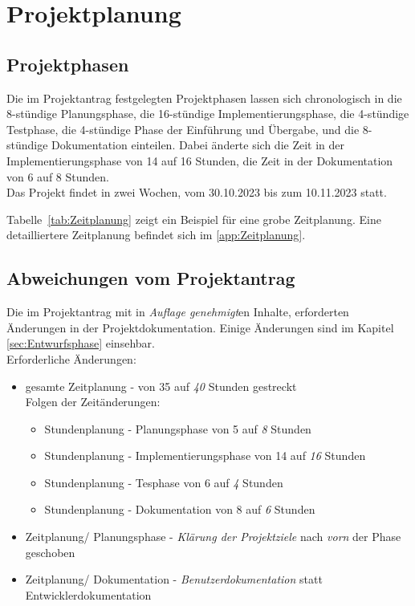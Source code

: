 \section{Projektplanung} 
\label{sec:Projektplanung}


\subsection{Projektphasen}
\label{sec:Projektphasen}
Die im Projektantrag festgelegten Projektphasen lassen sich chronologisch in die 8-stündige Planungsphase, 
die 16-stündige Implementierungsphase, die 4-stündige Testphase, die 4-stündige Phase der Einführung und Übergabe, 
und die 8-stündige Dokumentation einteilen.
Dabei änderte sich die Zeit in der Implementierungsphase von 14 auf 16 Stunden, die Zeit in der 
Dokumentation von 6 auf 8 Stunden.
\\Das Projekt findet in zwei Wochen, vom 30.10.2023 bis zum 10.11.2023 statt.

Tabelle~\ref{tab:Zeitplanung}  zeigt ein Beispiel für eine grobe Zeitplanung. 
Eine detailliertere Zeitplanung befindet sich im  \ref{app:Zeitplanung}.


\subsection{Abweichungen vom Projektantrag}
\label{sec:AbweichungenProjektantrag}
Die im Projektantrag mit in \textit{Auflage genehmigt}en Inhalte, erforderten Änderungen in der 
Projektdokumentation. Einige Änderungen sind im Kapitel \ref*{sec:Entwurfsphase} 
 einsehbar. 
\\Erforderliche Änderungen:
\begin{itemize} [label=--]
	\item gesamte Zeitplanung - von 35 auf \textit{40} Stunden gestreckt
	\\Folgen der Zeitänderungen:
	\begin{itemize}
		\item Stundenplanung - Planungsphase von 5 auf \textit{8} Stunden
		\item Stundenplanung - Implementierungsphase von 14 auf \textit{16} Stunden
		\item Stundenplanung - Tesphase von 6 auf \textit{4} Stunden
		\item Stundenplanung - Dokumentation von 8 auf \textit{6} Stunden 
	\end{itemize}
	\item Zeitplanung/ Planungsphase - \textit{Klärung der Projektziele} nach \textit{vorn} der Phase geschoben
	\item Zeitplanung/ Dokumentation - \textit{Benutzerdokumentation} statt Entwicklerdokumentation
\end{itemize}

